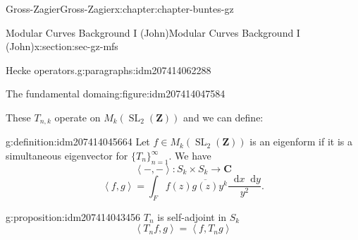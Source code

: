 \documentclass[oneside,10pt,]{book}
\numberwithin{equation}{section}
\newcommand{\diff}{\mathop{}\!\mathrm{d}}
\newcommand{\pair}[2]{\left\langle #1, #2 \right\rangle}
\newcommand{\ZZ}{\mathbf{Z}}
\newcommand{\CC}{\mathbf{C}}
\DeclareMathOperator{\SL}{SL}
\begin{document}
\begin{chapterptx}{Gross-Zagier}{}{Gross-Zagier}{}{}{x:chapter:chapter-buntes-gz}
\begin{sectionptx}{Modular Curves Background I (John)}{}{Modular Curves Background I (John)}{}{}{x:section:sec-gz-mfs}
\begin{paragraphs}{Hecke operators.}{g:paragraphs:idm207414062288}
\begin{figureptx}{The fundamental domain}{g:figure:idm207414047584}{}
\begin{image}{0}{1}{0}
{
}%
\end{image}%
\tcblower
\end{figureptx}%
These \(T_{n,k}\) operate on \(M_k(\SL_2(\ZZ))\) and we can define:%
\begin{definition}{}{g:definition:idm207414045664}%
Let \(f\in M_k(\SL_2(\ZZ))\) is an eigenform if it is a simultaneous eigenvector for \(\{T_n\}_{n=1}^\infty \). We have%
\begin{equation*}
\pair - - \colon  S_k \times S_k\to \CC
\end{equation*}
%
\begin{equation*}
\pair fg = \int_F f(z) \overline{g(z)} y^k \frac{\diff x \diff y}{y^2}\text{.}
\end{equation*}
%
\end{definition}
\begin{proposition}{}{}{g:proposition:idm207414043456}%
\(T_n\) is self-adjoint in \(S_k\)%
\begin{equation*}
\pair{T_n f}{g}=  \pair {f}{T_ng} 
\end{equation*}

\end{proposition}
\end{paragraphs}
\end{sectionptx}
\end{chapterptx}
\end{document}
